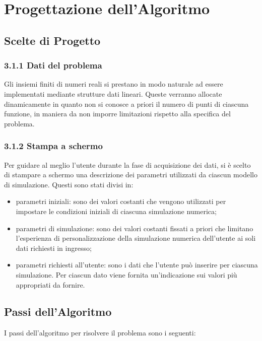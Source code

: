 \section{Progettazione dell'Algoritmo}
\subsection{Scelte di Progetto}

\subsubsection*{3.1.1 Dati del problema}
Gli insiemi finiti di numeri reali si prestano in modo naturale ad essere implementati mediante strutture dati lineari. Queste verranno allocate dinamicamente in quanto non si conosce a priori il numero di punti di ciascuna funzione, in maniera da non imporre limitazioni rispetto alla specifica del problema.

\subsubsection*{3.1.2 Stampa a schermo}
Per guidare al meglio l'utente durante la fase di acquisizione dei dati, si è scelto di stampare a schermo una descrizione dei parametri utilizzati da ciascun modello di simulazione. Questi sono stati divisi in:
\begin{itemize}
\item parametri iniziali: sono dei valori costanti che vengono utilizzati per impostare le condizioni iniziali di ciascuna simulazione numerica;
\item parametri di simulazione: sono dei valori costanti fissati a priori che limitano l'esperienza di personalizzazione della simulazione numerica dell'utente ai soli dati richiesti in ingresso;
\item parametri richiesti all'utente: sono i dati che l'utente può inserire per ciascuna simulazione. Per ciascun dato viene fornita un'indicazione sui valori più appropriati da fornire. 
\end{itemize} 


\subsection{Passi dell'Algoritmo}
I passi dell'algoritmo per risolvere il problema sono i seguenti:


